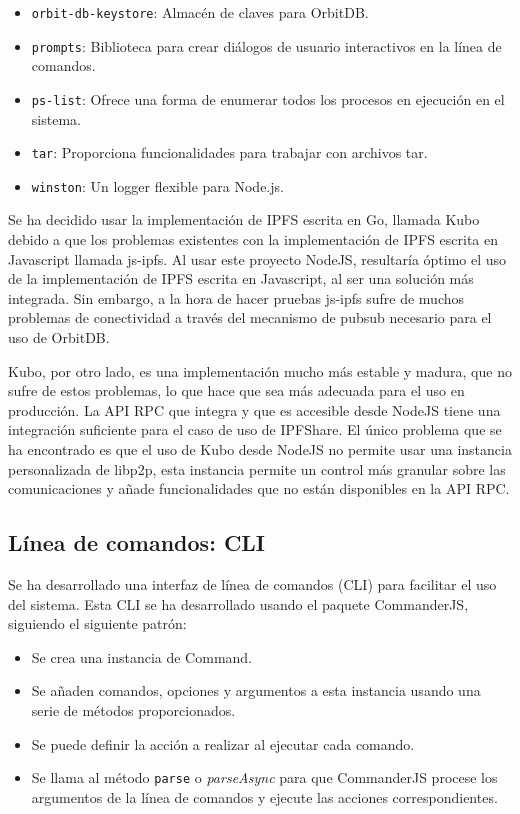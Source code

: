 \begin{itemize}[noitemsep,after=\vspace{-0.4\baselineskip}]
\begin{itemize}[noitemsep]
          \item \texttt{orbit-db-keystore}: Almacén de claves para OrbitDB.
          \item \texttt{prompts}: Biblioteca para crear diálogos de usuario interactivos en la línea de comandos.
          \item \texttt{ps-list}: Ofrece una forma de enumerar todos los procesos en ejecución en el sistema.
          \item \texttt{tar}: Proporciona funcionalidades para trabajar con archivos tar.
          \item \texttt{winston}: Un logger flexible para Node.js.
        \end{itemize}
\end{itemize}
Se ha decidido usar la implementación de IPFS escrita en Go, llamada Kubo debido a que los problemas existentes con la implementación de IPFS escrita en Javascript llamada js-ipfs.
Al usar este proyecto NodeJS, resultaría óptimo el uso de la implementación de IPFS escrita en Javascript, al ser una solución más integrada. Sin embargo, a la hora de hacer
pruebas js-ipfs sufre de muchos problemas de conectividad a través del mecanismo de pubsub necesario para el uso de OrbitDB.

Kubo, por otro lado, es una implementación mucho más estable y madura, que no sufre de estos problemas, lo que hace que sea más adecuada para el uso en producción. La API
RPC que integra y que es accesible desde NodeJS tiene una integración suficiente para el caso de uso de IPFShare. El único problema que se ha encontrado es que el uso de Kubo desde NodeJS no permite usar una instancia personalizada de libp2p, esta instancia permite un control más granular sobre las comunicaciones y añade funcionalidades que no están disponibles en la API RPC.

\subsection{Línea de comandos: CLI}\label{sssect:cli}
Se ha desarrollado una interfaz de línea de comandos (CLI) para facilitar el uso del sistema. Esta CLI se ha desarrollado usando el paquete CommanderJS, siguiendo el siguiente patrón:
\begin{itemize}[noitemsep,after=\vspace{-0.4\baselineskip}]
  \item Se crea una instancia de Command.
  \item Se añaden comandos, opciones y argumentos a esta instancia usando una serie de métodos proporcionados.
  \item Se puede definir la acción a realizar al ejecutar cada comando.
  \item Se llama al método \texttt{parse} o \textit{parseAsync} para que CommanderJS procese los argumentos de la línea de comandos y ejecute las acciones correspondientes.
\end{itemize}

